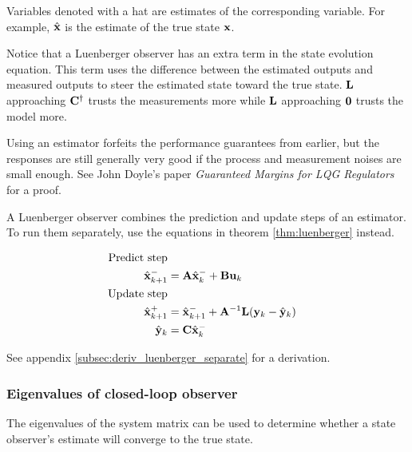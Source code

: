 Variables denoted with a hat are estimates of the corresponding variable. For
example, $\hat{\mathbf{x}}$ is the estimate of the true \gls{state} $\mathbf{x}$.

Notice that a Luenberger \gls{observer} has an extra term in the \gls{state}
evolution equation. This term uses the difference between the estimated
\glspl{output} and measured \glspl{output} to steer the estimated \gls{state}
toward the true \gls{state}. $\mathbf{L}$ approaching $\mathbf{C}^\dagger$ trusts the
measurements more while $\mathbf{L}$ approaching $\mathbf{0}$ trusts the \gls{model}
more.
\begin{remark}
  Using an estimator forfeits the performance guarantees from earlier, but the
  responses are still generally very good if the process and measurement noises
  are small enough. See John Doyle's paper \textit{Guaranteed Margins for LQG
  Regulators} for a proof.
\end{remark}

A Luenberger \gls{observer} combines the prediction and update steps of an
estimator. To run them separately, use the equations in theorem
\ref{thm:luenberger} instead.
\begin{theorem}
  \label{thm:luenberger}
  \begin{align}
    \text{Predict step} \nonumber \\
    \hat{\mathbf{x}}_{k+1}^- &= \mathbf{A}\hat{\mathbf{x}}_k^- + \mathbf{B}\mathbf{u}_k \\
    \text{Update step} \nonumber \\
    \hat{\mathbf{x}}_{k+1}^+ &= \hat{\mathbf{x}}_{k+1}^- + \mathbf{A}^{-1}\mathbf{L}
      (\mathbf{y}_k - \hat{\mathbf{y}}_k) \\
    \hat{\mathbf{y}}_k &= \mathbf{C} \hat{\mathbf{x}}_k^-
  \end{align}
\end{theorem}

See appendix \ref{subsec:deriv_luenberger_separate} for a derivation.

\subsubsection{Eigenvalues of closed-loop observer}

The eigenvalues of the system matrix can be used to determine whether a
\gls{state} \gls{observer}'s estimate will converge to the true \gls{state}.

